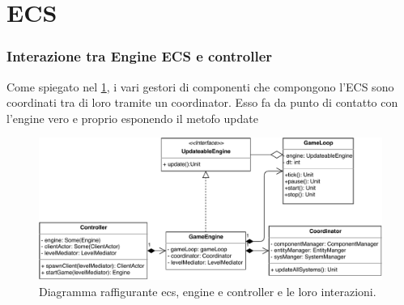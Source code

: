 \section{ECS}
\label{sec:ecs_design}


	\subsubsection{Interazione tra Engine ECS e controller}
	Come spiegato nel \ref{sec:ecs_design}, i vari gestori di componenti che compongono l'ECS sono coordinati tra di loro tramite un coordinator. Esso fa da punto di contatto con l'engine vero e proprio esponendo il metofo update
	\begin{figure}[H]
		\centering
		\includegraphics[width=\columnwidth]{drawio/ECS-engine-controller/ecs-engine-controller.pdf}
		\caption{Diagramma raffigurante ecs, engine e controller e le loro interazioni.}
		\label{fig:ecsenginecontroller}
	\end{figure}